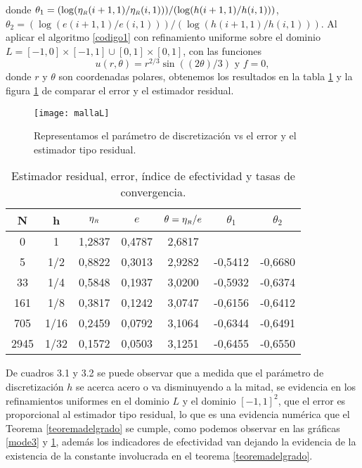 donde $ \theta_{1}=(\log(\eta_{\text{\tiny $R$}}(i+1,1)/\eta_{\text{\tiny     $R$}}(i,1)))/(\log(h(i+1,1)/h(i,1)))$,  $\theta_{2}=(\log(e(i+1,1)/e(i,1)))/(\log(h(i+1,1)/h(i,1)))$.
\newpage
Al aplicar el algoritmo \ref{codigo1} con refinamiento uniforme sobre el dominio $L=[-1,0]\times [-1,1]\cup [0,1]\times [0,1]$, con las funciones $$u(r,\theta)=r^{2/3}\sin((2\theta)/3) \text{ y }  f=0,$$ donde $r$ y $\theta$  son coordenadas polares, obtenemos los resultados en la tabla \ref{table2} y la figura \ref{fig:mode5uniforme} de comparar el error y el estimador residual.


\begin{figure}[h!]
	\centering
	\texttt{[image: mallaL]}
	\caption{ Representamos el par\'ametro de  discretizaci\'on vs el error y el estimador tipo residual.} 
	\label{fig:mode5uniforme}
\end{figure}

\begin{table}[ht!]\label{table2}
	\begin{center}
		\begin{tabular}{c|c | c| c| c| c | c} \hline
			N & h       &	$\eta_{\text{\tiny $R$}}$	   &    $e$ &	$\theta=\eta_{\text{\tiny     $R$}}/e$	& $\theta_{1}$	&  $\theta_{2}$ \\ \hline 
			0&1	    &1,2837	                           &0,4787	&2,6817	&	    &              \\
			5&1/2	    &0,8822	                           &0,3013	&2,9282	&-0,5412&	-0,6680  \\
			33&1/4	    &0,5848                            &0,1937	&3,0200	&-0,5932&	-0,6374 \\
			161&1/8	    &0,3817	                           &0,1242	&3,0747	&-0,6156&	-0,6412  \\
			705&1/16	&0,2459                            &0,0792  &3,1064 &-0,6344&	-0,6491  \\
			2945&1/32	&0,1572                            &0,0503  &3,1251 &-0,6455&	-0,6550  \\\hline
		\end{tabular}
		\caption{Estimador residual, error, \'indice de efectividad y tasas de convergencia.}
	\end{center}
\end{table}


De cuadros {\rm 3.1} y {\rm 3.2} se puede observar que a medida que el par\'ametro de discretizaci\'on $h$ se acerca acero o va disminuyendo a la mitad, se evidencia en los refinamientos uniformes en el dominio $L$ y el dominio $[-1, 1]^{2}$, que el error es proporcional al estimador tipo residual, lo que es una evidencia num\'erica  que el Teorema \ref{teoremadelgrado} se cumple, como podemos observar en las gr\'aficas \ref{mode3} y \ref{fig:mode5uniforme}, adem\'as los indicadores de efectividad van dejando la evidencia de la existencia de la constante involucrada en el teorema \ref{teoremadelgrado}.


